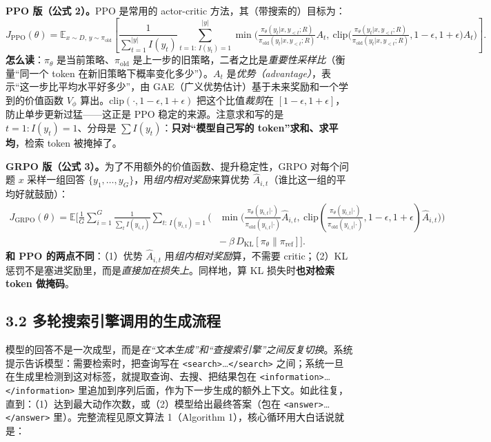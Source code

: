 \documentclass[11pt,UTF8,fontset=fandol]{ctexart}
\newcommand{\tg}[1]{\texttt{<#1>}}
\begin{document}
\textbf{PPO 版（公式 2）。}\quad PPO 是常用的 actor-critic 方法，其（带搜索的）目标为：
\begin{equation*}
J_{\mathrm{PPO}}(\theta)=\mathbb{E}_{x\sim D,\,y\sim\pi_{\mathrm{old}}}\!\left[\frac{1}{\sum_{t=1}^{|y|}I(y_t)}\!\!\sum_{t=1:\,I(y_t)=1}^{|y|}\!\!\min\!\Big(\tfrac{\pi_\theta(y_t|x,y_{<t};R)}{\pi_{\mathrm{old}}(y_t|x,y_{<t};R)}A_t,\ \mathrm{clip}\big(\tfrac{\pi_\theta(y_t|x,y_{<t};R)}{\pi_{\mathrm{old}}(y_t|x,y_{<t};R)},1{-}\epsilon,1{+}\epsilon\big)A_t\Big)\right].
\tag{2}
\end{equation*}
\textbf{怎么读}：$\pi_\theta$ 是当前策略、$\pi_{\mathrm{old}}$ 是上一步的旧策略，二者之比是\emph{重要性采样比}（衡量“同一个 token 在新旧策略下概率变化多少”）。$A_t$ 是\emph{优势（advantage）}，表示“这一步比平均水平好多少”，由 GAE（广义优势估计）基于未来奖励和一个学到的价值函数 $V_\phi$ 算出。$\mathrm{clip}(\cdot,1{-}\epsilon,1{+}\epsilon)$ 把这个比值\emph{裁剪}在 $[1{-}\epsilon,1{+}\epsilon]$，防止单步更新过猛——这正是 PPO 稳定的来源。注意求和写的是 $t=1:I(y_t)=1$、分母是 $\sum I(y_t)$：\textbf{只对“模型自己写的 token”求和、求平均}，检索 token 被掩掉了。

\textbf{GRPO 版（公式 3）。}\quad 为了不用额外的价值函数、提升稳定性，GRPO 对每个问题 $x$ 采样一组回答 $\{y_1,\dots,y_G\}$，用\emph{组内相对奖励}来算优势 $\hat A_{i,t}$（谁比这一组的平均好就鼓励）：
\begin{equation*}
\begin{aligned}
J_{\mathrm{GRPO}}(\theta)=\mathbb{E}\Big[\tfrac{1}{G}\sum_{i=1}^{G}\tfrac{1}{\sum_t I(y_{i,t})}\!\!\sum_{t:\,I(y_{i,t})=1}\!\!\Big(&\min\big(\tfrac{\pi_\theta(y_{i,t}|\cdot)}{\pi_{\mathrm{old}}(y_{i,t}|\cdot)}\hat A_{i,t},\ \mathrm{clip}(\tfrac{\pi_\theta(y_{i,t}|\cdot)}{\pi_{\mathrm{old}}(y_{i,t}|\cdot)},1{-}\epsilon,1{+}\epsilon)\hat A_{i,t}\big)\Big)\\[-0.2em]
&-\ \beta\, D_{\mathrm{KL}}[\pi_\theta\|\pi_{\mathrm{ref}}]\Big].
\end{aligned}
\tag{3}
\end{equation*}
\textbf{和 PPO 的两点不同}：（1）优势 $\hat A_{i,t}$ 用\emph{组内相对奖励}算，不需要 critic；（2）KL 惩罚不是塞进奖励里，而是\emph{直接加在损失上}。同样地，算 KL 损失时\textbf{也对检索 token 做掩码}。

\subsection{3.2 多轮搜索引擎调用的生成流程}

模型的回答不是一次成型，而是\emph{在“文本生成”和“查搜索引擎”之间反复切换}。系统提示告诉模型：需要检索时，把查询写在 \tg{search}…\tg{/search} 之间；系统一旦在生成里检测到这对标签，就提取查询、去搜、把结果包在 \tg{information}…\tg{/information} 里追加到序列后面，作为下一步生成的额外上下文。如此往复，直到：（1）达到最大动作次数，或（2）模型给出最终答案（包在 \tg{answer}…\tg{/answer} 里）。完整流程见原文算法 1（Algorithm 1），核心循环用大白话说就是：
\end{document}
